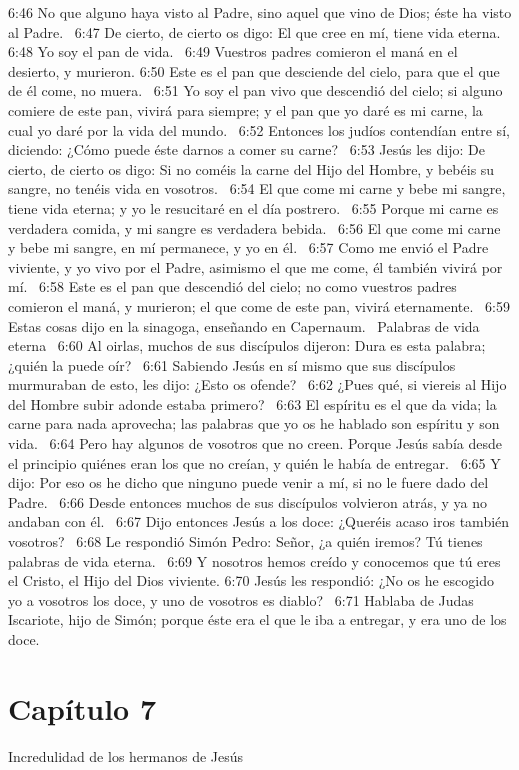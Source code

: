6:46 No que alguno haya visto al Padre, sino aquel que vino de Dios; éste ha visto al Padre.  
6:47 De cierto, de cierto os digo: El que cree en mí, tiene vida eterna.  
6:48 Yo soy el pan de vida.  
6:49 Vuestros padres comieron el maná en el desierto, y murieron. 
6:50 Este es el pan que desciende del cielo, para que el que de él come, no muera.  
6:51 Yo soy el pan vivo que descendió del cielo; si alguno comiere de este pan, vivirá para siempre; y el pan que yo daré es mi carne, la cual yo daré por la vida del mundo.  
6:52 Entonces los judíos contendían entre sí, diciendo: ¿Cómo puede éste darnos a comer su carne?  
6:53 Jesús les dijo: De cierto, de cierto os digo: Si no coméis la carne del Hijo del Hombre, y bebéis su sangre, no tenéis vida en vosotros.  
6:54 El que come mi carne y bebe mi sangre, tiene vida eterna; y yo le resucitaré en el día postrero.  
6:55 Porque mi carne es verdadera comida, y mi sangre es verdadera bebida.  
6:56 El que come mi carne y bebe mi sangre, en mí permanece, y yo en él.  
6:57 Como me envió el Padre viviente, y yo vivo por el Padre, asimismo el que me come, él también vivirá por mí.  
6:58 Este es el pan que descendió del cielo; no como vuestros padres comieron el maná, y murieron; el que come de este pan, vivirá eternamente.  
6:59 Estas cosas dijo en la sinagoga, enseñando en Capernaum.  
Palabras de vida eterna  
6:60 Al oirlas, muchos de sus discípulos dijeron: Dura es esta palabra; ¿quién la puede oír?  
6:61 Sabiendo Jesús en sí mismo que sus discípulos murmuraban de esto, les dijo: ¿Esto os ofende?  
6:62 ¿Pues qué, si viereis al Hijo del Hombre subir adonde estaba primero?  
6:63 El espíritu es el que da vida; la carne para nada aprovecha; las palabras que yo os he hablado son espíritu y son vida.  
6:64 Pero hay algunos de vosotros que no creen. Porque Jesús sabía desde el principio quiénes eran los que no creían, y quién le había de entregar.  
6:65 Y dijo: Por eso os he dicho que ninguno puede venir a mí, si no le fuere dado del Padre.  
6:66 Desde entonces muchos de sus discípulos volvieron atrás, y ya no andaban con él.  
6:67 Dijo entonces Jesús a los doce: ¿Queréis acaso iros también vosotros?  
6:68 Le respondió Simón Pedro: Señor, ¿a quién iremos? Tú tienes palabras de vida eterna.  
6:69 Y nosotros hemos creído y conocemos que tú eres el Cristo, el Hijo del Dios viviente. 
6:70 Jesús les respondió: ¿No os he escogido yo a vosotros los doce, y uno de vosotros es diablo?  
6:71 Hablaba de Judas Iscariote, hijo de Simón; porque éste era el que le iba a entregar, y era uno de los doce.  
\section*{Capítulo 7 }
Incredulidad de los hermanos de Jesús 


